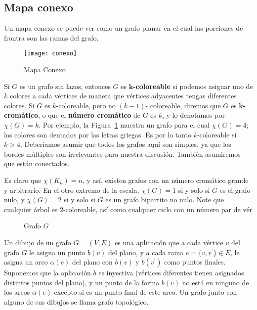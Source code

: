 \documentclass[3p,times,a4paper,twocolumn,authoryear]{elsarticle} %
\begin{document}
\subsection{Mapa conexo}\label{sec:2.1}
Un mapa conexo se puede ver como un grafo planar en el cual las porciones de frontra son las ramas del grafo.

\begin{figure}[H]
	\centering
	\texttt{[image: conexo]}
	\caption{Mapa Conexo}
\end{figure}    

Si $G$ es un grafo sin lazos, entonces $G$ es \textbf{$\bm{k}$-coloreable} si podemos asignar uno de $k$ colores a cada vértices de manera que vértices adyacentes tengas diferentes colores. Si $G$ es $k$-coloreable, pero no $(k-1)$- coloreable, diremos que $G$ es \textbf{$\bm{k}$-cromático}, o que el \textbf{número cromático} de $G$ es $k$, y lo denotamos por $\chi(G)=k$. Por ejemplo, la Figura~\ref{fig:1.1} muestra un grafo para el cual $\chi(G)=4$; los colores son dentados por las letras griegas. Es por lo tanto $k$-coloreable si $k>4$. Deberíamos asumir que todos los grafos aquí son simples, ya que los bordes múltiples son irrelevantes para nuestra discusión. También asumiremos que están conectados.

Es claro que $\chi(K_n)=n$, y así, existen grafos con un número cromático grande y arbitrario. En el otro extremo de la escala, $\chi(G)=1$ si y solo si $G$ es el grafo nulo, y $\chi(G)=2$ si y solo si $G$ es un grafo bipartito no nulo. Note que cualquier árbol es $2$-coloreable, así como cualquier ciclo con un número par de vér

\begin{figure}[H]
\centering
\scalebox{0.6}{}
\caption{Grafo $G$}\label{fig:1.1}
\end{figure}

\begin{definition}

Un dibujo de un grafo $G=(V,E)$ es una aplicación que a cada vértice $v$ del grafo $G$ le asigna un punto $b(v)$ del plano, y a cada rama $e=\{v,v^{\prime}\}\in E$, le asigna un arco $\alpha(e)$ del plano con $b(v)$ y $b(v^{\prime})$ como puntos finales. Suponemos que la aplicación $b$ es inyectiva (vértices diferentes tienen asignados distintos puntos del plano), y un punto de la forma $b(v)$ no está en ninguno de los arcos $\alpha(e)$ excepto si es un punto final de este arco. Un grafo junto con alguno de sus dibujos se llama grafo topológico.

\end{definition}
\end{document}
